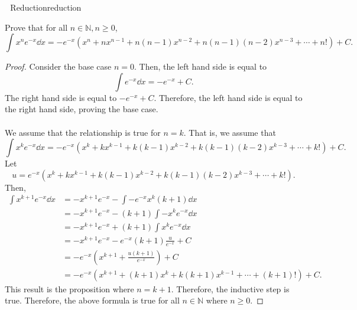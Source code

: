     \begin{exercise}{\Difficulty\,\Difficulty\,\Difficulty\,\,Reduction}{reduction}
    
        Prove that for all \(n\in\mathbb{N}, n \geq 0\),
        \begin{equation*}
            \int x^ne^{-x}\dd x = -e^{-x}\left(x^n+nx^{n-1}+n(n-1)x^{n-2}+n(n-1)(n-2)x^{n-3}+\cdots + n! \right)+C.
        \end{equation*}
        \begin{proof}
            Consider the base case \(n=0\). Then, the left hand side is equal to
            \begin{equation*}
                \int e^{-x} \dd x=-e^{-x}+C.
            \end{equation*}
            The right hand side is equal to \(-e^{-x}+C\). Therefore, the left hand side is equal to the right hand side, proving the base case.
            \\
            \\
            We assume that the relationship is true for \(n=k\). That is, we assume that
            \begin{equation*}
                \int x^ke^{-x}\dd x = -e^{-x}(x^k+kx^{k-1}+k(k-1)x^{k-2}+k(k-1)(k-2)x^{k-3}+\cdots + k!)+C.
            \end{equation*}
            Let
            \begin{equation*}
                u=e^{-x}(x^k+kx^{k-1}+k(k-1)x^{k-2}+k(k-1)(k-2)x^{k-3}+\cdots + k!).
            \end{equation*}
            Then,
            \begin{align*}
                \int x^{k+1}e^{-x}\dd x&=-x^{k+1}e^{-x}-\int -e^{-x}x^k(k+1) \dd x \\
                &=-x^{k+1}e^{-x}-(k+1)\int -x^ke^{-x} \dd x \\
                &=-x^{k+1}e^{-x}+(k+1)\int x^ke^{-x} \dd x \\
                &=-x^{k+1}e^{-x}-e^{-x}(k+1)\frac{u}{e^{-x}}+C \\
                &=-e^{-x}\left(x^{k+1}+\frac{u(k+1)}{e^{-x}}\right)+C \\
                &=-e^{-x}\left(x^{k+1}+(k+1)x^k+k(k+1)x^{k-1}+\cdots+(k+1)!\right)+C.
            \end{align*}
                This result is the proposition where \(n=k+1\). Therefore, the inductive step is true. Therefore, the above formula is true for all \(n\in\mathbb{N}\) where \(n \geq 0\).
        \end{proof}
    \end{exercise}
